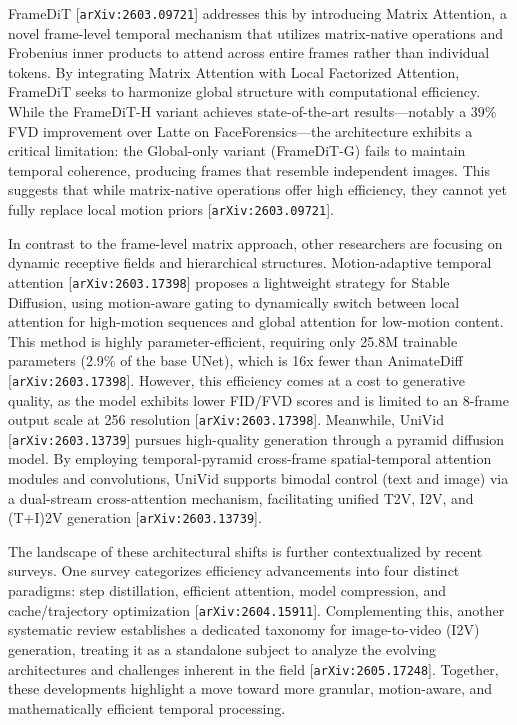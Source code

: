 \documentclass[11pt]{article}
\begin{document}
FrameDiT [\texttt{arXiv:2603.09721}] addresses this by introducing Matrix Attention, a novel frame-level temporal mechanism that utilizes matrix-native operations and Frobenius inner products to attend across entire frames rather than individual tokens. By integrating Matrix Attention with Local Factorized Attention, FrameDiT seeks to harmonize global structure with computational efficiency. While the FrameDiT-H variant achieves state-of-the-art results—notably a 39\% FVD improvement over Latte on FaceForensics—the architecture exhibits a critical limitation: the Global-only variant (FrameDiT-G) fails to maintain temporal coherence, producing frames that resemble independent images. This suggests that while matrix-native operations offer high efficiency, they cannot yet fully replace local motion priors [\texttt{arXiv:2603.09721}].

In contrast to the frame-level matrix approach, other researchers are focusing on dynamic receptive fields and hierarchical structures. Motion-adaptive temporal attention [\texttt{arXiv:2603.17398}] proposes a lightweight strategy for Stable Diffusion, using motion-aware gating to dynamically switch between local attention for high-motion sequences and global attention for low-motion content. This method is highly parameter-efficient, requiring only 25.8M trainable parameters (2.9\% of the base UNet), which is 16x fewer than AnimateDiff [\texttt{arXiv:2603.17398}]. However, this efficiency comes at a cost to generative quality, as the model exhibits lower FID/FVD scores and is limited to an 8-frame output scale at 256 resolution [\texttt{arXiv:2603.17398}]. Meanwhile, UniVid [\texttt{arXiv:2603.13739}] pursues high-quality generation through a pyramid diffusion model. By employing temporal-pyramid cross-frame spatial-temporal attention modules and convolutions, UniVid supports bimodal control (text and image) via a dual-stream cross-attention mechanism, facilitating unified T2V, I2V, and (T+I)2V generation [\texttt{arXiv:2603.13739}].

The landscape of these architectural shifts is further contextualized by recent surveys. One survey categorizes efficiency advancements into four distinct paradigms: step distillation, efficient attention, model compression, and cache/trajectory optimization [\texttt{arXiv:2604.15911}]. Complementing this, another systematic review establishes a dedicated taxonomy for image-to-video (I2V) generation, treating it as a standalone subject to analyze the evolving architectures and challenges inherent in the field [\texttt{arXiv:2605.17248}]. Together, these developments highlight a move toward more granular, motion-aware, and mathematically efficient temporal processing.
\end{document}
